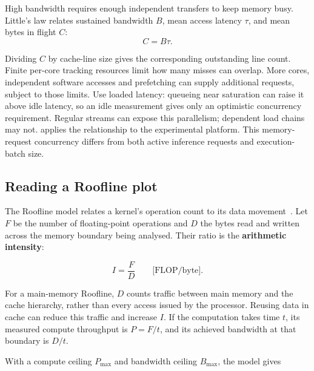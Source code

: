High bandwidth requires enough independent transfers to keep memory
busy.  Little's law relates sustained bandwidth \(B\), mean access
latency \(\tau\), and mean bytes in flight \(C\):
\begin{equation}
\label{eq:little}
 C=B\tau.
\end{equation}

Dividing \(C\) by cache-line size gives the corresponding outstanding
line count.  Finite per-core tracking resources limit how many misses
can overlap.  More cores, independent software accesses and prefetching
can supply additional requests, subject to those limits.  Use loaded
latency: queueing near saturation can raise it above idle latency, so an
idle measurement gives only an optimistic concurrency requirement.
Regular streams can expose this parallelism; dependent load chains may
not.   applies the relationship to the
experimental platform.  This memory-request concurrency differs from
both active inference requests and execution-batch size.

\subsection{Reading a Roofline plot}
\label{sec:roofline}

The Roofline model relates a kernel's operation count to its data
movement~\cite{williams2009roofline}.  Let \(F\) be the number of
floating-point operations and \(D\) the bytes read and written across
the memory boundary being analysed.  Their ratio is the
\textbf{arithmetic intensity}:

\begin{equation}
\label{eq:arithmetic-intensity}
  I = \frac{F}{D}
  \qquad \text{[FLOP/byte]}.
\end{equation}

For a main-memory Roofline, \(D\) counts traffic between main memory and
the cache hierarchy, rather than every access issued by the processor.
Reusing data in cache can reduce this traffic and increase \(I\).
If the computation takes time \(t\), its measured compute throughput is
\(P=F/t\), and its achieved bandwidth at that boundary is \(D/t\).

With a compute ceiling \(P_{\max}\) and bandwidth ceiling
\(B_{\max}\), the model gives

